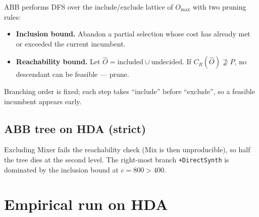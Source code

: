 \documentclass[11pt,a4paper]{article}
\newcommand{\code}[1]{\texttt{\small #1}}
\begin{document}
ABB performs DFS over the include/exclude lattice of $O_{\max}$ with
two pruning rules:
\begin{itemize}
\item \textbf{Inclusion bound.} Abandon a partial selection whose
  cost has already met or exceeded the current incumbent.
\item \textbf{Reachability bound.} Let
  $\widehat{O} = \mathrm{included} \cup \mathrm{undecided}$. If
  $C_R(\widehat O) \not\supseteq P$, no descendant can be feasible
  --- prune.
\end{itemize}
Branching order is fixed; each step takes ``include'' before
``exclude'', so a feasible incumbent appears early.

\subsection*{ABB tree on HDA (strict)}

\begin{center}
\end{center}
\noindent
Excluding Mixer fails the reachability check (Mix is then
unproducible), so half the tree dies at the second level. The
right-most branch \code{+DirectSynth} is dominated by the inclusion
bound at $c=800>400$.

\section{Empirical run on HDA}
\end{document}
